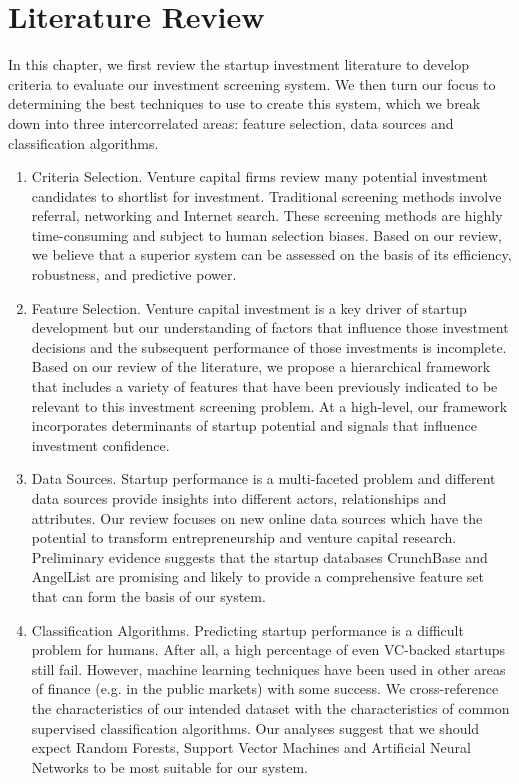 \documentclass[../thesis/thesis.tex]{subfiles}
\begin{document}
\chapter{Literature Review}
\label{chap:litreview}


In this chapter, we first review the startup investment literature to develop criteria to evaluate our investment screening system. We then turn our focus to determining the best techniques to use to create this system, which we break down into three intercorrelated areas: feature selection, data sources and classification algorithms.

\begin{enumerate}

\item Criteria Selection. Venture capital firms review many potential investment candidates to shortlist for investment. Traditional screening methods involve referral, networking and Internet search. These screening methods are highly time-consuming and subject to human selection biases. Based on our review, we believe that a superior system can be assessed on the basis of its efficiency, robustness, and predictive power.

\item Feature Selection. Venture capital investment is a key driver of startup development but our understanding of factors that influence those investment decisions and the subsequent performance of those investments is incomplete. Based on our review of the literature, we propose a hierarchical framework that includes a variety of features that have been previously indicated to be relevant to this investment screening problem. At a high-level, our framework incorporates determinants of startup potential and signals that influence investment confidence.

\item Data Sources. Startup performance is a multi-faceted problem and different data sources provide insights into different actors, relationships and attributes. Our review focuses on new online data sources which have the potential to transform entrepreneurship and venture capital research. Preliminary evidence suggests that the startup databases CrunchBase and AngelList are promising and likely to provide a comprehensive feature set that can form the basis of our system.

\item Classification Algorithms. Predicting startup performance is a difficult problem for humans. After all, a high percentage of even VC-backed startups still fail. However, machine learning techniques have been used in other areas of finance (e.g. in the public markets) with some success. We cross-reference the characteristics of our intended dataset with the characteristics of common supervised classification algorithms. Our analyses suggest that we should expect Random Forests, Support Vector Machines and Artificial Neural Networks to be most suitable for our system.

\end{enumerate}
\end{document}
